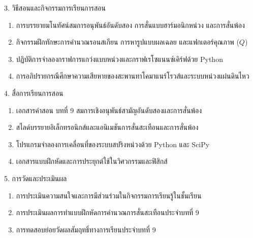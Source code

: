\newpage

\begin{planbox}[colframe=rbruNavy!85!black, colbacktitle=rbruNavy!85!black]{3. วิธีสอนและกิจกรรมการเรียนการสอน}
\begin{enumerate}[topsep=2pt, itemsep=1pt, partopsep=0pt, parsep=0pt, leftmargin=1.5em]
    \item การบรรยายมโนทัศน์สมการอนุพันธ์อันดับสอง การสั่นแบบฮาร์มอนิกหน่วง และการสั่นพ้อง
    \item กิจกรรมฝึกทักษะการคำนวณรอนสเกียน การหารูปแบบผลเฉลย และแฟกเตอร์คุณภาพ ($Q$)
    \item ปฏิบัติการจำลองกราฟการแกว่งแบบหน่วงและกราฟเรโซแนนซ์เคิร์ฟด้วย Python
    \item การอภิปรายกรณีศึกษาความเสียหายของสะพานทาโคมาแนร์โรวส์และระบบหน่วงแผ่นดินไหว
\end{enumerate}
\end{planbox}

\begin{planbox}[colframe=rbruGold!90!black, colbacktitle=rbruGold!90!black]{4. สื่อการเรียนการสอน}
\begin{enumerate}[topsep=2pt, itemsep=1pt, partopsep=0pt, parsep=0pt, leftmargin=1.5em]
    \item เอกสารคำสอน บทที่ 9 สมการเชิงอนุพันธ์สามัญอันดับสองและการสั่นพ้อง
    \item สไลด์บรรยายอิเล็กทรอนิกส์และแอนิเมชันการสั่นสะเทือนและการสั่นพ้อง
    \item โปรแกรมจำลองการเคลื่อนที่ของระบบสปริงหน่วงด้วย Python และ SciPy
    \item เอกสารแบบฝึกหัดและการประยุกต์ใช้ในวิศวกรรมและฟิสิกส์
\end{enumerate}
\end{planbox}

\begin{planbox}[colframe=rbruSlate, colbacktitle=rbruSlate]{5. การวัดและประเมินผล}
\begin{enumerate}[topsep=2pt, itemsep=1pt, partopsep=0pt, parsep=0pt, leftmargin=1.5em]
    \item การประเมินความสนใจและการมีส่วนร่วมในกิจกรรมการเรียนรู้ในชั้นเรียน
    \item การประเมินผลการทำแบบฝึกหัดการคำนวณการสั่นสะเทือนประจำบทที่ 9
    \item การทดสอบย่อยวัดผลสัมฤทธิ์ทางการเรียนประจำบทที่ 9
\end{enumerate}
\end{planbox}
\clearpage

